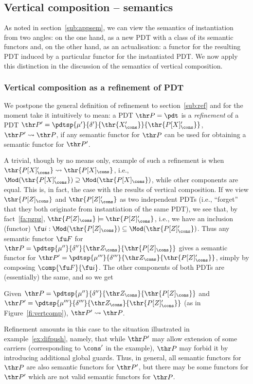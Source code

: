 \subsection{Vertical composition -- semantics}\label{sub:vcsem}
%
As noted in section~\ref{sub:appsem}, we can view the semantics of
instantiation from two angles: on the one hand, as a new PDT with a class of
its semantic functors and, on the other hand, as an actualisation: a functor
for the resulting PDT induced by a
particular functor for the instantiated PDT. We now apply this distinction in
the discussion of the semantics of vertical composition.

\subsubsection{Vertical composition as a refinement of PDT}\label{sub:vertref}
We postpone the general definition of refinement to section~\ref{sub:ref} and for
the moment take it intuitively to mean:
a PDT  $\thr P=\pdt$ is a {\em
refinement} of a PDT  $\thr
P'=\pdtsp{\mu'}{\delta'}{\thr{X'_\cons}}{\thr{P[X]'_\cons}}$, $\thr
P'\leadsto \thr P$, if any semantic 
functor for $\thr P$ can be used for obtaining 
a semantic functor for $\thr P'$.

A trivial, though by no means only, example of such a refinement is when
$\thr{P[X]'_\cons}\leadsto\thr{P[X]_\cons}$, i.e.,
$\Mod(\thr{P[X]'_\cons})\supseteq \Mod(\thr{P[X]_\cons})$, while other
components are equal. This is, in fact, the case with the results of vertical
composition. If we view $\thr{P[Z]_\cons}$ and $\thr{P[Z]'_\cons}$ as two
independent PDTs (i.e., ``forget'' that they both originate from instantiation
of the same PDT), we see that, 
by fact~\ref{fa:pzpz}, $\thr{P[Z]_\cons}\models
\thr{P[Z]'_\cons}$, i.e., we have an inclusion (functor)
$\fu i:\Mod(\thr{P[Z]_\cons})\subseteq\Mod(\thr{P[Z]'_\cons})$. 
Thus any semantic functor $\fu F$ for $\thr P= \pdtsp{\mu''}{\delta''}{\thr
Z_\cons}{\thr{P[Z]_\cons}}$ 
gives a semantic functor for $\thr P'= \pdtsp{\mu'''}{\delta'''}{\thr
Z_\cons}{\thr{P[Z]'_\cons}}$, simply 
by composing $\comp{\fu F}{\fu i}$.
The other components of both PDTs are (essentially) the same, and so we get
%
\begin{fact}
Given $\thr P= \pdtsp{\mu''}{\delta''}{\thr
Z_\cons}{\thr{P[Z]_\cons}}$ and  $\thr P'= \pdtsp{\mu'''}{\delta'''}{\thr
Z_\cons}{\thr{P[Z]'_\cons}}$ (as in Figure~\ref{fi:vertcomp}), $\thr P'\leadsto \thr P$.
\end{fact}
%
Refinement amounts in this case to the situation illustrated in
example~\ref{ex:difpush}, namely, that while $\thr P'$ may allow extension of
some carriers (corresponding to $\cons'$ in the example), $\thr P$ may forbid
it by introducing additional global guards. Thus, in general, all semantic
functors for $\thr P$ are also semantic functors for $\thr P'$, but there may
be some functors for $\thr P'$ which are not valid semantic functors for
$\thr P$.

